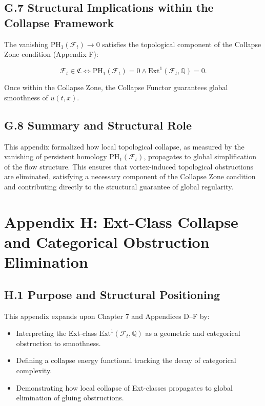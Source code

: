 \documentclass[11pt]{article}
\begin{document}
\subsection*{G.7 Structural Implications within the Collapse Framework}

The vanishing \( \mathrm{PH}_1(\mathcal{F}_t) \to 0 \) satisfies the topological component of the Collapse Zone condition (Appendix F):

\[
\mathcal{F}_t \in \mathfrak{C} \iff \mathrm{PH}_1(\mathcal{F}_t) = 0 \land \mathrm{Ext}^1(\mathcal{F}_t, \mathbb{Q}) = 0.
\]

Once within the Collapse Zone, the Collapse Functor guarantees global smoothness of \( u(t, x) \).

\subsection*{G.8 Summary and Structural Role}

This appendix formalized how local topological collapse, as measured by the vanishing of persistent homology \( \mathrm{PH}_1(\mathcal{F}_t) \), propagates to global simplification of the flow structure.  
This ensures that vortex-induced topological obstructions are eliminated, satisfying a necessary component of the Collapse Zone condition and contributing directly to the structural guarantee of global regularity.



\section*{Appendix H: Ext-Class Collapse and Categorical Obstruction Elimination}

\subsection*{H.1 Purpose and Structural Positioning}

This appendix expands upon Chapter 7 and Appendices D–F by:

\begin{itemize}
  \item Interpreting the Ext-class \( \mathrm{Ext}^1(\mathcal{F}_t, \mathbb{Q}) \) as a geometric and categorical obstruction to smoothness.
  \item Defining a collapse energy functional tracking the decay of categorical complexity.
  \item Demonstrating how local collapse of Ext-classes propagates to global elimination of gluing obstructions.
\end{itemize}
\end{document}
